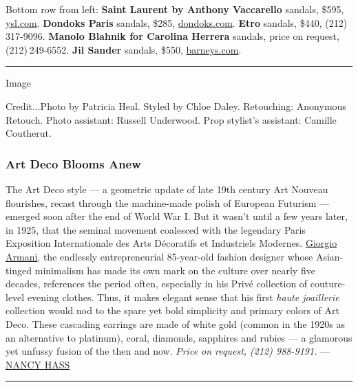 Bottom row from left: \textbf{Saint Laurent by Anthony Vaccarello}
sandals, \$595, \href{https://www.ysl.com/us/}{ysl.com}. \textbf{Dondoks
Paris} sandals, \$285, \href{https://dondoks.com/}{dondoks.com}.
\textbf{Etro} sandals, \$440, (212) 317-9096. \textbf{Manolo Blahnik for
Carolina Herrera} sandals, price on request, (212) 249-6552. \textbf{Jil
Sander} sandals, \$550, \href{https://www.barneys.com/}{barneys.com}.

\begin{center}\rule{0.5\linewidth}{\linethickness}\end{center}

Image

Credit...Photo by Patricia Heal. Styled by Chloe Daley. Retouching:
Anonymous Retouch. Photo assistant: Russell Underwood. Prop stylist's
assistant: Camille Coutherut.

\hypertarget{art-deco-blooms-anew}{%
\subsubsection{Art Deco Blooms Anew}\label{art-deco-blooms-anew}}

The Art Deco style --- a geometric update of late 19th century Art
Nouveau flourishes, recast through the machine-made polish of European
Futurism --- emerged soon after the end of World War I. But it wasn't
until a few years later, in 1925, that the seminal movement coalesced
with the legendary Paris Exposition Internationale des Arts Décoratifs
et Industriels Modernes.
\href{https://www.nytimes3xbfgragh.onion/2018/11/19/t-magazine/giorgio-armani-home-broni-italy.html}{Giorgio
Armani}, the endlessly entrepreneurial 85-year-old fashion designer
whose Asian-tinged minimalism has made its own mark on the culture over
nearly five decades, references the period often, especially in his
Privé collection of couture-level evening clothes. Thus, it makes
elegant sense that his first \emph{haute joaillerie} collection would
nod to the spare yet bold simplicity and primary colors of Art Deco.
These cascading earrings are made of white gold (common in the 1920s as
an alternative to platinum), coral, diamonds, sapphires and rubies --- a
glamorous yet unfussy fusion of the then and now. \emph{Price on
request, (212) 988-9191.} ---
\href{https://www.nytimes3xbfgragh.onion/by/nancy-hass}{NANCY HASS}

\begin{center}\rule{0.5\linewidth}{\linethickness}\end{center}

